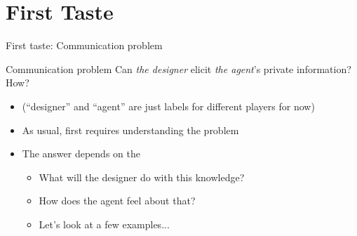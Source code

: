 \documentclass[english,10pt
,aspectratio=169
]{beamer}
\begin{document}




\section{First Taste}

\begin{frame}{First taste: Communication problem}
	\begin{block}{Communication problem}
		Can \emph{the designer} elicit \emph{the agent}'s \alert{private information}? How?
	\end{block}
	\begin{itemize}
		\item (``designer'' and ``agent'' are just labels for different players for now)
		\pause 
		\item As usual,  first requires \alert{understanding the problem}
		\pause
		\item The answer depends on the 
		\begin{itemize}
			\item What will the designer do with this knowledge?
			\item How does the agent feel about that?
			\item Let's look at a few examples...
		\end{itemize}
	\end{itemize}
\end{frame}
\end{document}
